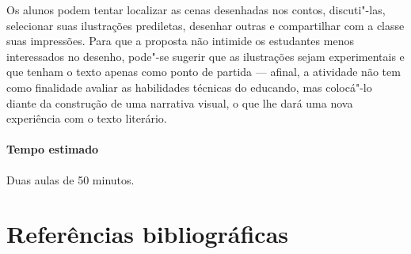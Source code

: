 \documentclass[11pt]{extarticle}
\begin{document}
Os alunos podem tentar localizar as cenas desenhadas nos contos,
discuti"-las, selecionar suas ilustrações prediletas, desenhar outras e
compartilhar com a classe suas impressões. Para que a proposta não
intimide os estudantes menos interessados no desenho, pode"-se sugerir
que as ilustrações sejam experimentais e que tenham o texto apenas como
ponto de partida --- afinal, a atividade não tem como finalidade avaliar
as habilidades técnicas do educando, mas colocá"-lo diante da construção
de uma narrativa visual, o que lhe dará uma nova experiência com o texto
literário.

\paragraph{Tempo estimado} Duas aulas de 50 minutos.


\section{Referências bibliográficas}
\end{document}
